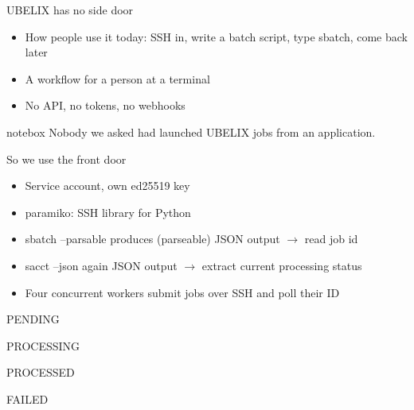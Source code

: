 \documentclass[aspectratio=169,11pt]{beamer}
\newenvironment{notebox}
  {\begin{beamercolorbox}[wd=\dimexpr\textwidth-16pt\relax,sep=8pt]{notebox}\small}
  {\end{beamercolorbox}}
\newcommand{\badge}[2]{{\setlength{\fboxsep}{3pt}\colorbox{#1}{\color{white}\bfseries\footnotesize\strut #2}}}
\newcommand{\key}[1]{{\color{ubBlue}\ttfamily #1}}
\begin{document}
\begin{frame}{UBELIX has no side door}
  \begin{itemize}\setlength\itemsep{0.8em}
    \item How people use it today: SSH in, write a batch script, type \key{sbatch},
      come back later
    \item A workflow for a person at a terminal
    \item No API, no tokens, no webhooks
  \end{itemize}
  \vspace{1.2em}
  \begin{notebox}
    Nobody we asked had launched UBELIX jobs from an application.
  \end{notebox}
\end{frame}

\begin{frame}{So we use the front door}
  \begin{itemize}\setlength\itemsep{0.55em}
    \item Service account, own ed25519 key
    \item \key{paramiko}: SSH library for Python
    \item \key{sbatch --parsable} produces (parseable) JSON output $\rightarrow$ read job id
    \item \key{sacct --json} again JSON output $\rightarrow$ extract current processing status
    \item Four concurrent workers submit jobs over SSH and poll their ID
  \end{itemize}
  \vspace{1.0em}
  \begin{center}
    \badge{ubGreyDark}{PENDING}\hspace{0.7em}
    \badge{ubYellow}{PROCESSING}\hspace{0.7em}
    \badge{ubGreen}{PROCESSED}\hspace{0.7em}
    \badge{ubRedDark}{FAILED}
  \end{center}
\end{frame}
\end{document}
